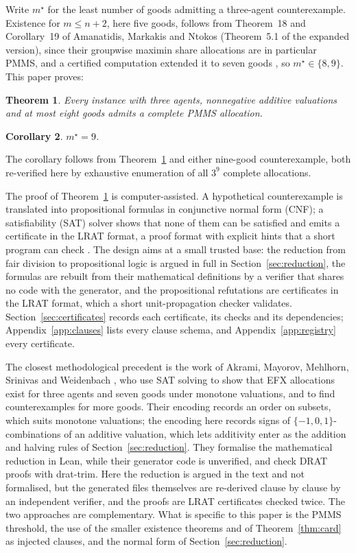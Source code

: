 \documentclass[11pt,a4paper]{article}
\newtheorem{theorem}{Theorem}
\newtheorem{corollary}[theorem]{Corollary}
\theoremstyle{remark}
\begin{document}
Write $m^\star$ for the least number of goods admitting a three-agent counterexample. Existence for $m\le n+2$, here five goods, follows from Theorem~18 and Corollary~19 of Amanatidis, Markakis and Ntokos \cite{AMN20} (Theorem~5.1 of the expanded version), since their groupwise maximin share allocations are in particular PMMS, and a certified computation extended it to seven goods \cite{Anon7}, so $m^\star\in\{8,9\}$. This paper proves:

\begin{theorem}\label{thm:main}
Every instance with three agents, nonnegative additive valuations and at most eight goods admits a complete PMMS allocation.
\end{theorem}

\begin{corollary}
$m^\star = 9$.
\end{corollary}

The corollary follows from Theorem~\ref{thm:main} and either nine-good counterexample, both re-verified here by exhaustive enumeration of all $3^9$ complete allocations.

The proof of Theorem~\ref{thm:main} is computer-assisted. A hypothetical counterexample is translated into propositional formulas in conjunctive normal form (CNF); a satisfiability (SAT) solver shows that none of them can be satisfied and emits a certificate in the LRAT format, a proof format with explicit hints that a short program can check \cite{CHHKS17}. The design aims at a small trusted base: the reduction from fair division to propositional logic is argued in full in Section~\ref{sec:reduction}, the formulas are rebuilt from their mathematical definitions by a verifier that shares no code with the generator, and the propositional refutations are certificates in the LRAT format, which a short unit-propagation checker validates. Section~\ref{sec:certificates} records each certificate, its checks and its dependencies; Appendix~\ref{app:clauses} lists every clause schema, and Appendix~\ref{app:registry} every certificate.

The closest methodological precedent is the work of Akrami, Mayorov, Mehlhorn, Srinivas and Weidenbach \cite{AMMSW26}, who use SAT solving to show that EFX allocations exist for three agents and seven goods under monotone valuations, and to find counterexamples for more goods. Their encoding records an order on subsets, which suits monotone valuations; the encoding here records signs of $\{-1,0,1\}$-combinations of an additive valuation, which lets additivity enter as the addition and halving rules of Section~\ref{sec:reduction}. They formalise the mathematical reduction in Lean, while their generator code is unverified, and check DRAT proofs with drat-trim. Here the reduction is argued in the text and not formalised, but the generated files themselves are re-derived clause by clause by an independent verifier, and the proofs are LRAT certificates checked twice. The two approaches are complementary. What is specific to this paper is the PMMS threshold, the use of the smaller existence theorems and of Theorem~\ref{thm:card} as injected clauses, and the normal form of Section~\ref{sec:reduction}.
\end{document}
